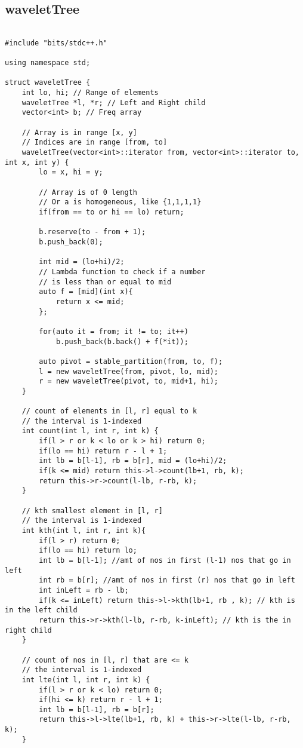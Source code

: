\documentclass[landscape,twocolumn,10pt,a4paper]{article}
\begin{document}
\subsection{waveletTree}
\begin{verbatim}

#include "bits/stdc++.h"

using namespace std;

struct waveletTree {
    int lo, hi; // Range of elements
    waveletTree *l, *r; // Left and Right child
    vector<int> b; // Freq array

    // Array is in range [x, y]
    // Indices are in range [from, to]
    waveletTree(vector<int>::iterator from, vector<int>::iterator to, int x, int y) {
        lo = x, hi = y;

        // Array is of 0 length
        // Or a is homogeneous, like {1,1,1,1}
        if(from == to or hi == lo) return;

        b.reserve(to - from + 1);
        b.push_back(0);

        int mid = (lo+hi)/2;
        // Lambda function to check if a number
        // is less than or equal to mid
        auto f = [mid](int x){
			return x <= mid;
		};

        for(auto it = from; it != to; it++)
			b.push_back(b.back() + f(*it));

        auto pivot = stable_partition(from, to, f);
		l = new waveletTree(from, pivot, lo, mid);
		r = new waveletTree(pivot, to, mid+1, hi);
    }

    // count of elements in [l, r] equal to k
    // the interval is 1-indexed
	int count(int l, int r, int k) {
		if(l > r or k < lo or k > hi) return 0;
		if(lo == hi) return r - l + 1;
		int lb = b[l-1], rb = b[r], mid = (lo+hi)/2;
		if(k <= mid) return this->l->count(lb+1, rb, k);
		return this->r->count(l-lb, r-rb, k);
	}

    // kth smallest element in [l, r]
    // the interval is 1-indexed
	int kth(int l, int r, int k){
		if(l > r) return 0;
		if(lo == hi) return lo;
		int lb = b[l-1]; //amt of nos in first (l-1) nos that go in left 
		int rb = b[r]; //amt of nos in first (r) nos that go in left
		int inLeft = rb - lb;
		if(k <= inLeft) return this->l->kth(lb+1, rb , k); // kth is in the left child
		return this->r->kth(l-lb, r-rb, k-inLeft); // kth is the in right child
	}

    // count of nos in [l, r] that are <= k
    // the interval is 1-indexed
	int lte(int l, int r, int k) {
		if(l > r or k < lo) return 0;
		if(hi <= k) return r - l + 1;
		int lb = b[l-1], rb = b[r];
		return this->l->lte(lb+1, rb, k) + this->r->lte(l-lb, r-rb, k);
	}
    

\end{verbatim}
\end{document}
